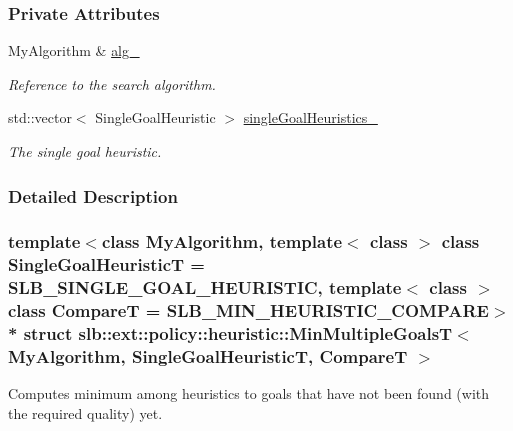 \subsubsection*{Private Attributes}
\begin{DoxyCompactItemize}
\item 
My\+Algorithm \& \hyperlink{structslb_1_1ext_1_1policy_1_1heuristic_1_1MinMultipleGoalsT_abc9bfa56b1be12d3a091c186b6197536}{alg\+\_\+}\hypertarget{structslb_1_1ext_1_1policy_1_1heuristic_1_1MinMultipleGoalsT_abc9bfa56b1be12d3a091c186b6197536}{}\label{structslb_1_1ext_1_1policy_1_1heuristic_1_1MinMultipleGoalsT_abc9bfa56b1be12d3a091c186b6197536}

\begin{DoxyCompactList}\small\item\em Reference to the search algorithm. \end{DoxyCompactList}\item 
std\+::vector$<$ Single\+Goal\+Heuristic $>$ \hyperlink{structslb_1_1ext_1_1policy_1_1heuristic_1_1MinMultipleGoalsT_ac0f9e20c15cf714620bc7f25dbbfa202}{single\+Goal\+Heuristics\+\_\+}\hypertarget{structslb_1_1ext_1_1policy_1_1heuristic_1_1MinMultipleGoalsT_ac0f9e20c15cf714620bc7f25dbbfa202}{}\label{structslb_1_1ext_1_1policy_1_1heuristic_1_1MinMultipleGoalsT_ac0f9e20c15cf714620bc7f25dbbfa202}

\begin{DoxyCompactList}\small\item\em The single goal heuristic. \end{DoxyCompactList}\end{DoxyCompactItemize}


\subsubsection{Detailed Description}
\subsubsection*{template$<$class My\+Algorithm, template$<$ class $>$ class Single\+Goal\+HeuristicT = S\+L\+B\+\_\+\+S\+I\+N\+G\+L\+E\+\_\+\+G\+O\+A\+L\+\_\+\+H\+E\+U\+R\+I\+S\+T\+IC, template$<$ class $>$ class CompareT = S\+L\+B\+\_\+\+M\+I\+N\+\_\+\+H\+E\+U\+R\+I\+S\+T\+I\+C\+\_\+\+C\+O\+M\+P\+A\+RE$>$\\*
struct slb\+::ext\+::policy\+::heuristic\+::\+Min\+Multiple\+Goals\+T$<$ My\+Algorithm, Single\+Goal\+Heuristic\+T, Compare\+T $>$}

Computes minimum among heuristics to goals that have not been found (with the required quality) yet. 



